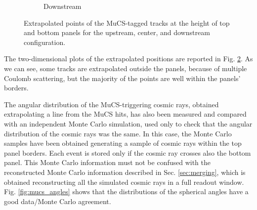 \documentclass[a4paper]{scrartcl}
\begin{document}
\begin{figure}[htbp]
\begin{subfigure}{0.32\textwidth}
    \caption{Downstream} \label{fig:downstream_align}
  \end{subfigure}

  \caption{Extrapolated points of the MuCS-tagged tracks at the height of top and bottom panels for the upstream, center, and downstream configuration.} \label{fig:alignment}
\end{figure}


The two-dimensional plots of the extrapolated positions are reported in Fig. \ref{fig:alignment}. As we can see, some tracks are extrapolated outside the panels, because of multiple Coulomb scattering, but the majority of the points are well within the panels' borders.


The angular distribution of the MuCS-triggering cosmic rays, obtained extrapolating a line from the MuCS hits, has also been measured and compared with an independent Monte Carlo simulation, used only to check that the angular distribution of the cosmic rays was the same.  In this case, the Monte Carlo samples have been obtained generating a sample of cosmic rays within the top panel borders. Each event is stored only if the cosmic ray crosses also the bottom panel. This Monte Carlo information must not be confused with the reconstructed Monte Carlo information described in Sec. \ref{sec:merging}, which is obtained reconstructing all the simulated cosmic rays in a full readout window. Fig. \ref{fig:mucs_angles} shows that the distributions of the spherical angles have a good data/Monte Carlo agreement.
\end{document}

